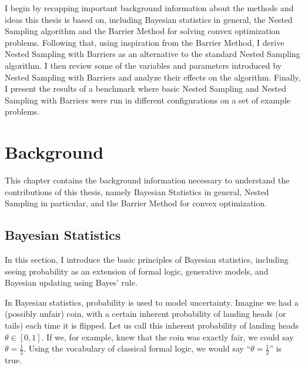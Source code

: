 \documentclass[12pt, a4paper]{report}
\begin{document}
I begin by recapping important background information about the methods and ideas this thesis is based on, including Bayesian statistics in general, the Nested Sampling algorithm and the Barrier Method for solving convex optimization problems.
Following that, using inspiration from the Barrier Method, I derive Nested Sampling with Barriers as an alternative to the standard Nested Sampling algorithm.
I then review some of the variables and parameters introduced by Nested Sampling with Barriers and analyze their effects on the algorithm.
Finally, I present the results of a benchmark where basic Nested Sampling and Nested Sampling with Barriers were run in different configurations on a set of example problems.
\setcounter{page}{5}

\chapter{Background}
This chapter contains the background information necessary to understand the contributions of this thesis, namely Bayesian Statistics in general, Nested Sampling in particular, and the Barrier Method for convex optimization.
\section{Bayesian Statistics}
In this section, I introduce the basic principles of Bayesian statistics, including seeing probability as an extension of formal logic, generative models, and Bayesian updating using Bayes' rule.

In Bayesian statistics, probability is used to model uncertainty.
Imagine we had a (possibly unfair) coin, with a certain inherent probability of landing heads (or tails) each time it is flipped.
Let us call this inherent probability of landing heads $\theta \in [0, 1]$.
If we, for example, knew that the coin was exactly fair, we could say $\theta = \frac{1}{2}$.
Using the vocabulary of classical formal logic, we would say ``$\theta = \frac{1}{2}$'' is true.
\end{document}
